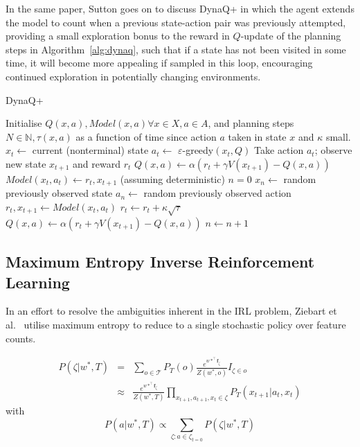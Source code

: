 \documentclass[10pt,technote]{IEEEtran}
\begin{document}
In the same paper, Sutton goes on to discuss DynaQ+ in which the agent extends the model to count when a previous state-action pair was previously attempted, providing a small exploration bonus to the reward in $Q$-update of the planning steps in Algorithm~\ref{alg:dynaq}, such that if a state has not been visited in some time, it will become more appealing if sampled in this loop, encouraging continued exploration in potentially changing environments.

\begin{algorithm}
\caption{DynaQ+}
\begin{algorithmic}[1]
\Require Initialise $Q(x,a),Model(x,a) \forall x \in X, a \in A$, and planning steps $N \in \mathbb{N}, \tau(x,a)$ as a function of time since action $a$ taken in state $x$ and $\kappa$ small. 
\State $x_t \leftarrow$ current (nonterminal) state
\State $a_t \leftarrow$ $\varepsilon$-greedy$(x_t,Q)$
\State Take action $a_t$; observe new state $x_{t+1}$ and reward $r_t$
\State $Q(x,a) \leftarrow \alpha \left(r_t + \gamma V(x_{t+1}) -  Q(x,a) \right)$
\State $Model(x_t,a_t) \leftarrow r_t, x_{t+1}$ (assuming deterministic)
\State $n=0$
\State $x_n \leftarrow$ random previously observed state
\State $a_n \leftarrow$ random previously observed action
\State $r_t, x_{t+1} \leftarrow Model(x_t,a_t)$
\State $r_t \leftarrow r_t + \kappa \sqrt{\tau}$ 
\State $Q(x,a) \leftarrow \alpha \left(r_t + \gamma V(x_{t+1}) -  Q(x,a) \right)$
\State $n \leftarrow n+1$
\EndWhile
\EndWhile
\end{algorithmic}
\label{alg:dynaq}
\end{algorithm}

\subsection{Maximum Entropy Inverse Reinforcement Learning}

In an effort to resolve the ambiguities inherent in the IRL problem, Ziebart et al.~\cite{ziebart2008maximum} utilise maximum entropy to reduce to a single stochastic policy over feature counts.

\begin{eqnarray}
P(\zeta | w^*, T)&=&\sum_{o \in \mathcal{T}} P_T (o) \frac{e^{w*^{\top} \textbf{f}_\zeta }}{Z (w^*, o)} I_{\zeta \in o} \\
&\approx & \frac{e^{w*^{\top} \textbf{f}_\zeta }}{Z (w^*, T)} \prod_{x_{t+1}, a_{t+1}, x_t \in \zeta} P_T (x_{t+1} | a_{t}, x_{t})
\end{eqnarray}
with
\begin{equation}
P(a | w^*, T) \propto \sum_{\zeta : a \in \zeta_{t=0} }P (\zeta | w^*, T)
\end{equation}
\end{document}

